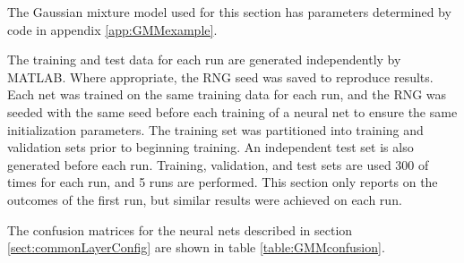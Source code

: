 \label{sect:GMMresults}
The Gaussian mixture model used for this section has parameters determined by code in appendix \ref{app:GMMexample}.


The training and test data for each run are generated independently by MATLAB\null. Where appropriate, the RNG seed was saved to reproduce results.  Each net was trained on the same training data for each run, and the RNG was seeded with the same seed before each training of a neural net to ensure the same initialization parameters. The training set was partitioned into training and validation sets prior to beginning training.  An independent test set is also generated before each run.  Training, validation, and test sets are used 300 of times for each run, and 5 runs are performed.  This section only reports on the outcomes of the first run, but similar results were achieved on each run.

The confusion matrices for the neural nets described in section \ref{sect:commonLayerConfig} are shown in table \ref{table:GMMconfusion}.

